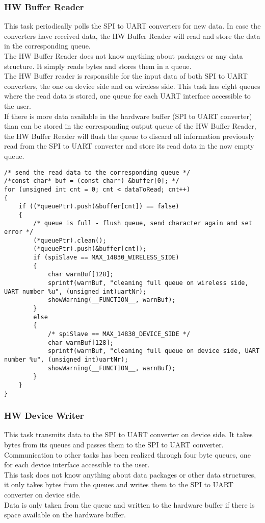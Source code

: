 \subsubsection{HW Buffer Reader}
This task periodically polls the SPI to UART converters for new data. In case the converters have received data, the HW Buffer Reader will read and store the data in the corresponding queue. \\
The HW Buffer Reader does not know anything about packages or any data structure. It simply reads bytes and stores them in a queue.\\
The HW Buffer reader is responsible for the input data of both SPI to UART converters, the one on device side and on wireless side. This task has eight queues where the read data is stored, one queue for each UART interface accessible to the user. \\
If there is more data available in the hardware buffer (SPI to UART converter) than can be stored in the corresponding output queue of the HW Buffer Reader, the HW Buffer Reader will flush the queue to discard all information previously read from the SPI to UART converter and store its read data in the now empty queue. \\
%
\begin{lstlisting}
/* send the read data to the corresponding queue */
/*const char* buf = (const char*) &buffer[0]; */
for (unsigned int cnt = 0; cnt < dataToRead; cnt++)
{
    if ((*queuePtr).push(&buffer[cnt]) == false)
    {
        /* queue is full - flush queue, send character again and set error */
        (*queuePtr).clean();
        (*queuePtr).push(&buffer[cnt]);
        if (spiSlave == MAX_14830_WIRELESS_SIDE)
        {
            char warnBuf[128];
            sprintf(warnBuf, "cleaning full queue on wireless side, UART number %u", (unsigned int)uartNr);
            showWarning(__FUNCTION__, warnBuf);
        }
        else
        {
            /* spiSlave == MAX_14830_DEVICE_SIDE */
            char warnBuf[128];
            sprintf(warnBuf, "cleaning full queue on device side, UART number %u", (unsigned int)uartNr);
            showWarning(__FUNCTION__, warnBuf);
        }
    }
}
\end{lstlisting}
%
\subsubsection{HW Device Writer}
This task transmits data to the SPI to UART converter on device side. It takes bytes from its queues and passes them to the SPI to UART converter.\\
Communication to other tasks has been realized through four byte queues, one for each device interface accessible to the user. \\
This task does not know anything about data packages or other data structures, it only takes bytes from the queues and writes them to the SPI to UART converter on device side.\\
Data is only taken from the queue and written to the hardware buffer if there is space available on the hardware buffer.

